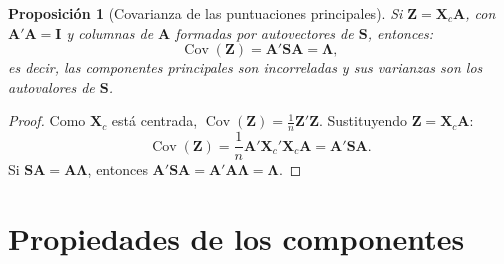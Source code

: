 \documentclass[12pt, a4paper]{article}
\theoremstyle{plain}
\newtheorem{proposicion}[teorema]{Proposición}
\theoremstyle{definition}
\theoremstyle{remark}
\newcommand{\mat}[1]{\mathbf{#1}}
\newcommand{\Cov}{\operatorname{Cov}}
\begin{document}
\begin{proposicion}[Covarianza de las puntuaciones principales]
Si $\mat{Z}=\mat{X}_c\mat{A}$, con $\mat{A}'\mat{A}=\mat{I}$ y columnas de
$\mat{A}$ formadas por autovectores de $\mat{S}$, entonces:
\[
  \Cov(\mat{Z})=\mat{A}'\mat{S}\mat{A}=\boldsymbol{\Lambda},
\]
es decir, las componentes principales son incorreladas y sus varianzas son los
autovalores de $\mat{S}$.
\end{proposicion}

\begin{proof}
Como $\mat{X}_c$ está centrada, $\Cov(\mat{Z})=\frac{1}{n}\mat{Z}'\mat{Z}$.
Sustituyendo $\mat{Z}=\mat{X}_c\mat{A}$:
\[
  \Cov(\mat{Z})
  = \frac{1}{n}\mat{A}'\mat{X}_c'\mat{X}_c\mat{A}
  = \mat{A}'\mat{S}\mat{A}.
\]
Si $\mat{S}\mat{A}=\mat{A}\boldsymbol{\Lambda}$, entonces
$\mat{A}'\mat{S}\mat{A}=\mat{A}'\mat{A}\boldsymbol{\Lambda}
=\boldsymbol{\Lambda}$.
\end{proof}

\section{Propiedades de los componentes}
\end{document}
